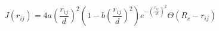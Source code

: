\documentclass[preview]{standalone}
\begin{document}
\begin{varwidth}{50in}
  \begin{equation}
    {J}\left( r_{ij} \right) = 4 a \left( \frac{r_{ij}}{d}  \right)^2 \left( 1 - b \left( \frac{r_{ij}}{d}  \right)^2 \right) e^{-\left( \frac{r_{ij}}{d}  
    \right)^2 }\Theta (R_c - r_{ij}) \nonumber
  \end{equation}
\end{varwidth}
\end{document}
